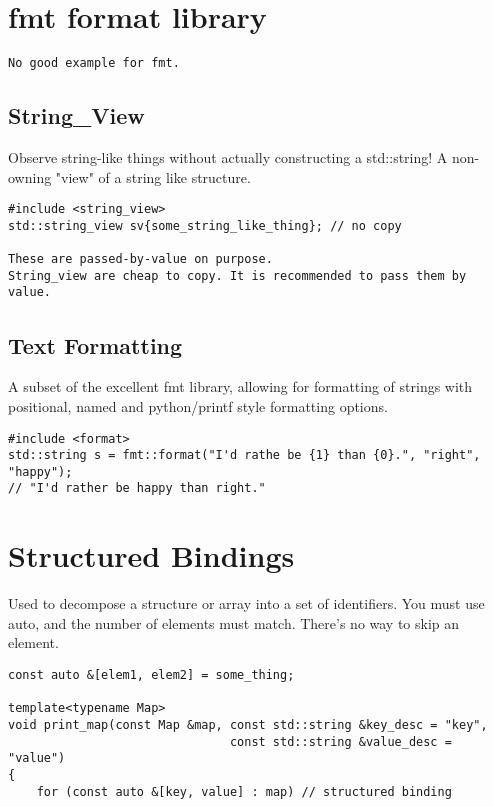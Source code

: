 \section{fmt format library}

\begin{verbatim}
No good example for fmt.
\end{verbatim}
\subsection{String\_View}

Observe string-like things without actually constructing a std::string!
A non-owning "view" of a string like structure.

\begin{verbatim}
#include <string_view>
std::string_view sv{some_string_like_thing}; // no copy

These are passed-by-value on purpose.
String_view are cheap to copy. It is recommended to pass them by value.
\end{verbatim}

\subsection{Text Formatting}

A subset of the excellent {fmt} library, allowing for formatting of strings with positional,
named and python/printf style formatting options.

\begin{verbatim}
#include <format>
std::string s = fmt::format("I'd rathe be {1} than {0}.", "right", "happy");
// "I'd rather be happy than right."
\end{verbatim}

\section{Structured Bindings}

Used to decompose a structure or array into a set of identifiers.
You must use auto, and the number of elements must match. There's no way to skip an element.

\begin{verbatim}
const auto &[elem1, elem2] = some_thing;

template<typename Map>
void print_map(const Map &map, const std::string &key_desc = "key",
                               const std::string &value_desc = "value")
{
    for (const auto &[key, value] : map) // structured binding
\end{verbatim}

